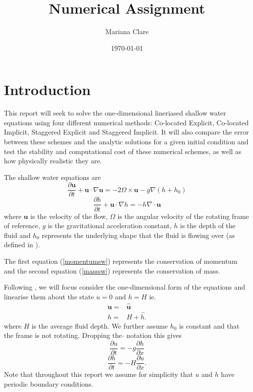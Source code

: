 \documentclass[a4paper,12pt, notitlepage]{article}
\title{Numerical Assignment}
\author{Mariana Clare}
\date{\today}
\begin{document}
	
\maketitle
\thispagestyle{empty}
\section{Introduction}
This report will seek to solve the one-dimensional lineriased shallow water equations using four different numerical methods: Co-located Explicit, Co-located Implicit, Staggered Explicit and Staggered Implicit. It will also compare the error between these schemes and the analytic solutions for a given initial condition and test the stability and computational cost of these numerical schemes, as well as how physically realistic they are.

The shallow water equations are
\begin{equation}\label{momentumsw}
\frac{\partial \mathbf{u}}{\partial t} + \mathbf{u}\cdot\nabla\mathbf{u} = - 2\Omega \times\mathbf{u} - g\nabla (h + h_{0})
\end{equation}
\begin{equation}\label{masssw}
\frac{\partial h}{\partial t} + \mathbf{u}\cdot\nabla h = - h \nabla \cdot \mathbf{u}
\end{equation}
where $\mathbf{u}$ is the velocity of the flow, $\Omega$ is the angular velocity of the rotating frame of reference, $g$ is the gravitational acceleration constant, $h$ is the depth of the fluid and $h_{0}$ represents the underlying shape that the fluid is flowing over (as defined in \cite{MPE textbook}).

The first equation (\ref{momentumsw}) represents the conservation of momentum and the second equation (\ref{masssw}) represents the conservation of mass.

Following \cite{MPE textbook}, we will focus consider the one-dimensional form of the equations and linearise them about the state $u = 0$ and $h = H$ ie.
\begin{eqnarray}
\mathbf{u} =  & \mathbf{\hat{u}}
 \\   \nonumber
h = &  H + \hat{h} .
\end{eqnarray}
where $H$ is the average fluid depth. We further assume $h_{0}$ is constant and that the frame is not rotating. Dropping the $\hat{}$ notation this gives
\begin{equation}\label{linearisedsw1}
\frac{\partial u}{\partial t} = - g \frac{\partial h}{\partial x}
\end{equation}
\begin{equation}\label{linearisedsw2}
\frac{\partial h}{\partial t} = - H \frac{\partial u}{\partial x}.
\end{equation}
 Note that throughout this report we assume for simplicity that $u$ and $h$ have periodic boundary conditions.
\end{document}
